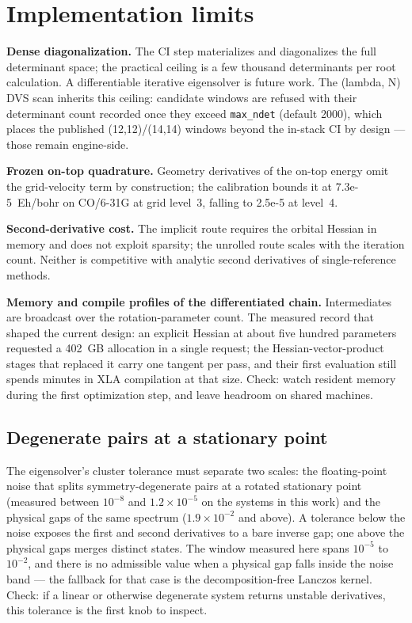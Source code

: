 \section{Implementation limits}

\textbf{Dense diagonalization.}  The CI step materializes and
diagonalizes the full determinant space; the practical ceiling is a
few thousand determinants per root calculation.  A differentiable
iterative eigensolver is future work.  The (lambda, N) DVS scan inherits this ceiling: candidate windows are refused with their determinant count recorded once they exceed \texttt{max\_ndet} (default 2000), which places the published (12,12)/(14,14) windows beyond the in-stack CI by design --- those remain engine-side.

\textbf{Frozen on-top quadrature.}  Geometry derivatives of the on-top energy omit the grid-velocity term by construction; the calibration bounds it at 7.3e-5~Eh/bohr on CO/6-31G at grid level~3, falling to 2.5e-5 at level~4.


\textbf{Second-derivative cost.}  The implicit route requires the
orbital Hessian in memory and does not exploit sparsity; the unrolled
route scales with the iteration count.  Neither is competitive with
analytic second derivatives of single-reference methods.

\textbf{Memory and compile profiles of the differentiated chain.}
Intermediates are broadcast over the rotation-parameter count.  The
measured record that shaped the current design: an explicit Hessian
at about five hundred parameters requested a 402~GB allocation in a
single request; the Hessian-vector-product stages that replaced it
carry one tangent per pass, and their first evaluation still spends
minutes in XLA compilation at that size.  Check: watch resident
memory during the first optimization step, and leave headroom on
shared machines.

\subsection{Degenerate pairs at a stationary point}

The eigensolver's cluster tolerance must separate two scales: the
floating-point noise that splits symmetry-degenerate pairs at a
rotated stationary point (measured between $10^{-8}$ and
$1.2\times10^{-5}$ on the systems in this work) and the physical gaps
of the same spectrum ($1.9\times10^{-2}$ and above).  A tolerance
below the noise exposes the first and second derivatives to a bare
inverse gap; one above the physical gaps merges distinct states.  The
window measured here spans $10^{-5}$ to $10^{-2}$, and there is no
admissible value when a physical gap falls inside the noise band ---
the fallback for that case is the decomposition-free Lanczos kernel.
Check: if a linear or otherwise degenerate system returns unstable
derivatives, this tolerance is the first knob to inspect.

